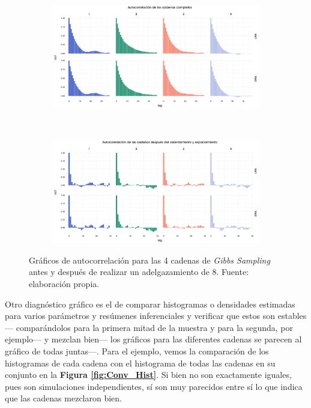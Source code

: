 \begin{figure}[h]
    \centering
    \begin{subfigure}{0.45\textwidth}
        \includegraphics[width=\textwidth]{Figs/Bayes/Ejemplos_Convergencia_Autocorr_Completas}
    \end{subfigure}
    ~ 
    \begin{subfigure}{0.45\textwidth}
        \includegraphics[width=\textwidth]{Figs/Bayes/Ejemplos_Convergencia_Autocorr_Final}
    \end{subfigure}
    \caption{Gráficos de autocorrelación para las 4 cadenas de \textit{Gibbs Sampling} antes y después de realizar un adelgazamiento de 8. Fuente: elaboración propia.}\label{fig:Conv_Autocorr}
\end{figure}

Otro diagnóstico gráfico es el de comparar histogramas o densidades estimadas para varios parámetros y resúmenes inferenciales y verificar que estos son estables--- comparándolos para la primera mitad de la muestra y para la segunda, por ejemplo--- y mezclan bien--- los gráficos para las diferentes cadenas se parecen al gráfico de todas juntas---. Para el ejemplo, vemos la comparación de los histogramas de cada cadena con el histograma de todas las cadenas en su conjunto en la \textbf{Figura \ref{fig:Conv_Hist}}. Si bien no son exactamente iguales, pues son simulaciones independientes, sí son muy parecidos entre sí lo que indica que las cadenas mezclaron bien.\\

